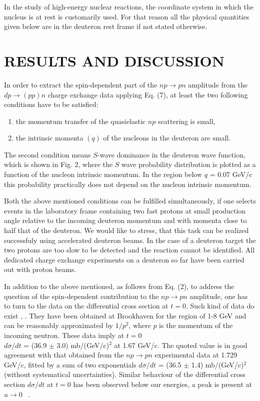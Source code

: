 In the study of high-energy nuclear reactions, the  coordinate system
 in which the nucleus is at rest is customarily used. For that reason all
the physical quantities given below are in the deuteron rest frame if
not stated otherwise.

\section{RESULTS AND DISCUSSION}

In order to extract the spin-dependent part of the $np\to pn$ amplitude from the
$dp\to (pp)n$ charge exchange data applying Eq. (7), at least the two
following conditions have to be satisfied:
\begin{enumerate}
\item the momentum transfer of the quasielastic $np$ scattering is small,
\item the intrinsic momenta $(q)$ of the nucleons in the deuteron are small.
\end{enumerate}

The second condition means $S$-wave dominance in the deuteron wave function,
which is shown
in Fig. 2, where the $S$ wave probability distribution
is plotted as a function of the nucleon intrinsic momentum. In the region
below $q$ = 0.07 GeV/c this probability practically does not depend on the nucleon
intrinsic momentum.

Both the above mentioned conditions can be fulfilled simultaneously, if one
selects events in the laboratory frame containing two fast protons  at small
production angle relative to the incoming deuteron momentum and with momenta
 close
to half that of the deuteron. We would like to stress, that this task
can be realized successfuly using accelerated deuteron beams.
In the case of a deuteron target the two protons are too slow to be detected
and the reaction cannot be identified. All dedicated
charge exchange experiments on a deuteron so far have been carried out
 with proton beams.

In addition to the above mentioned, as follows from Eq. (2), to address
the question of the spin-dependent contribution to the $np\to pn$ amplitude,
one has to turn to the data on the differential cross section at $t=0$.
Such kind of data do exist \cite {Fri}, \cite {She}.
They have been obtained at Brookhaven \cite {Fri} for the region
of 1-8 GeV and can
be reasonably approximated by $1/p^2$, where $p$ is the momentum of the incoming
neutron. These data imply at $t=0$\\
 $d\sigma/dt$ = (36.9 $\pm$ 3.0) mb/(GeV/c)$^2$
at 1.67 GeV/c.  The quoted value is in good agreement with that obtained from
the $np\to pn$ experimental data \cite{She} at 1.729 GeV/c, fitted by a sum of
 two
 exponentials $d\sigma/dt$ = (36.5 $\pm$ 1.4) mb/(GeV/c)$^2$ (without
systematical uncertainties). Similar behaviour of the differential cross
section $d\sigma/dt$ at $t=0$ has been observed below our energies,
a peak is present at $u\to 0$ ~\cite{Bon}.

